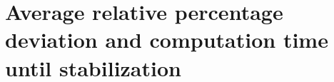 \newpage\cleardoublepage{}
\section{Average relative percentage deviation and computation time until stabilization}
\label{app:report}